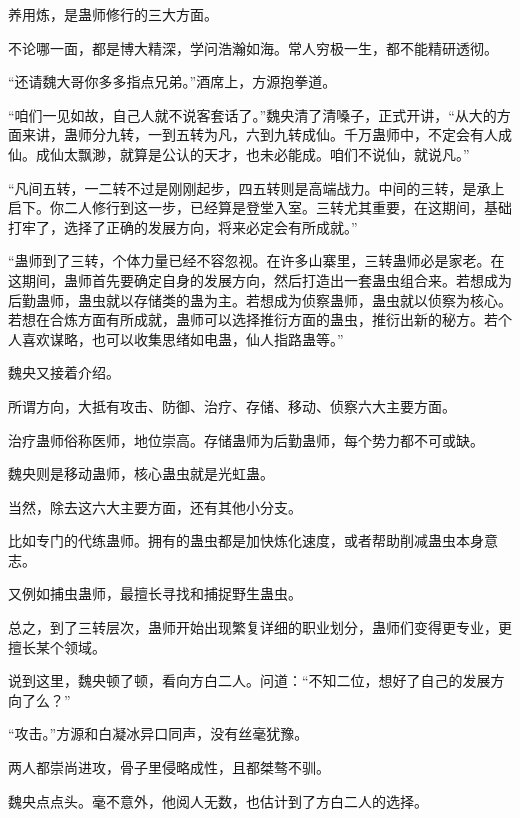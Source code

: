 
\begin{this_body}



养用炼，是蛊师修行的三大方面。

不论哪一面，都是博大精深，学问浩瀚如海。常人穷极一生，都不能精研透彻。

“还请魏大哥你多多指点兄弟。”酒席上，方源抱拳道。

“咱们一见如故，自己人就不说客套话了。”魏央清了清嗓子，正式开讲，“从大的方面来讲，蛊师分九转，一到五转为凡，六到九转成仙。千万蛊师中，不定会有人成仙。成仙太飘渺，就算是公认的天才，也未必能成。咱们不说仙，就说凡。”

“凡间五转，一二转不过是刚刚起步，四五转则是高端战力。中间的三转，是承上启下。你二人修行到这一步，已经算是登堂入室。三转尤其重要，在这期间，基础打牢了，选择了正确的发展方向，将来必定会有所成就。”

“蛊师到了三转，个体力量已经不容忽视。在许多山寨里，三转蛊师必是家老。在这期间，蛊师首先要确定自身的发展方向，然后打造出一套蛊虫组合来。若想成为后勤蛊师，蛊虫就以存储类的蛊为主。若想成为侦察蛊师，蛊虫就以侦察为核心。若想在合炼方面有所成就，蛊师可以选择推衍方面的蛊虫，推衍出新的秘方。若个人喜欢谋略，也可以收集思绪如电蛊，仙人指路蛊等。”

魏央又接着介绍。

所谓方向，大抵有攻击、防御、治疗、存储、移动、侦察六大主要方面。

治疗蛊师俗称医师，地位崇高。存储蛊师为后勤蛊师，每个势力都不可或缺。

魏央则是移动蛊师，核心蛊虫就是光虹蛊。

当然，除去这六大主要方面，还有其他小分支。

比如专门的代练蛊师。拥有的蛊虫都是加快炼化速度，或者帮助削减蛊虫本身意志。

又例如捕虫蛊师，最擅长寻找和捕捉野生蛊虫。

总之，到了三转层次，蛊师开始出现繁复详细的职业划分，蛊师们变得更专业，更擅长某个领域。

说到这里，魏央顿了顿，看向方白二人。问道：“不知二位，想好了自己的发展方向了么？”

“攻击。”方源和白凝冰异口同声，没有丝毫犹豫。

两人都崇尚进攻，骨子里侵略成性，且都桀骜不驯。

魏央点点头。毫不意外，他阅人无数，也估计到了方白二人的选择。


\end{this_body}
